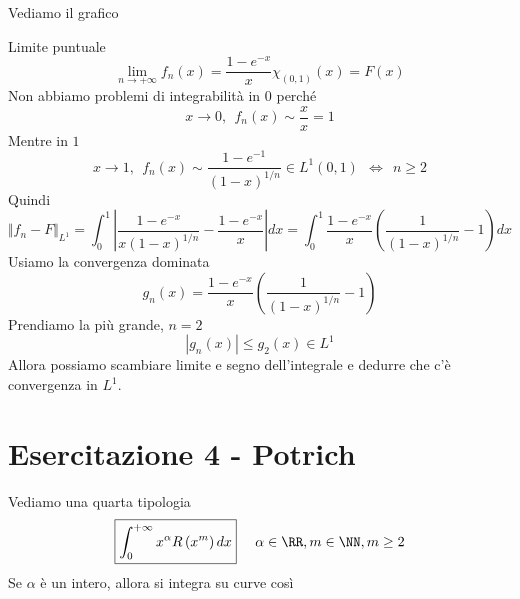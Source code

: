 \Soluzione

Vediamo il grafico


Limite puntuale
\begin{equation*}
\lim\limits_{n\rightarrow + \infty} f_{n}(x) = \frac{1 - e^{- x}}{x} \chi_{(0, 1)} (x) = F(x)
\end{equation*}
Non abbiamo problemi di integrabilità in $0$ perché
\begin{equation*}
x\rightarrow 0, \ \ f_{n}(x) \sim \frac{x}{x} = 1
\end{equation*}
Mentre in $1$
\begin{equation*}
x\rightarrow 1, \ \ f_{n}(x) \sim \frac{1 - e^{- 1}}{(1 - x)^{1/n}} \in L^{1}(0, 1) \ \ \iff \ \ n \geq 2
\end{equation*}
Quindi
\begin{equation*}
\Vert f_{n} - F\Vert_{L^{1}} = \int^{1}_{0}\left| \frac{1 - e^{- x}}{x(1 - x)^{1/n}} - \frac{1 - e^{- x}}{x}\right| dx = \int^{1}_{0}\frac{1 - e^{- x}}{x}\left(\frac{1}{(1 - x)^{1/n}} - 1\right) dx
\end{equation*}
Usiamo la convergenza dominata
\begin{equation*}
g_{n}(x) = \frac{1 - e^{- x}}{x}\left(\frac{1}{(1 - x)^{1/n}} - 1\right)
\end{equation*}
Prendiamo la più grande, $n = 2$
\begin{equation*}
| g_{n}(x)| \leq g_{2}(x) \in L^{1}
\end{equation*}
Allora possiamo scambiare limite e segno dell'integrale e dedurre che c'è convergenza in $L^{1}$.
\chapter{Esercitazione 4 - Potrich}

\ParteEsercizi

\Esercizio{}

Vediamo una quarta tipologia
\begin{equation*}
\boxed{\int^{+ \infty}_{0} x^{\alpha} R\left(x^{m}\right) dx} \ \ \ \ \alpha \in \RR, m\in \NN, m \geq 2
\end{equation*}
Se $\alpha $ è un intero, allora si integra su curve così


